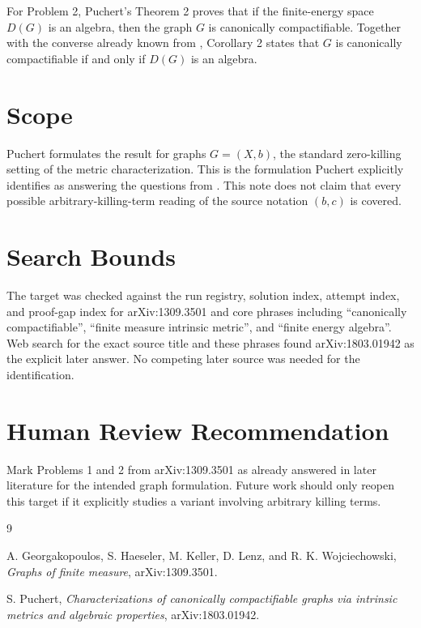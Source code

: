 \documentclass[11pt]{article}
\begin{document}
For Problem 2, Puchert's Theorem 2 proves that if the finite-energy space
$D(G)$ is an algebra, then the graph $G$ is canonically compactifiable.
Together with the converse already known from \cite{GHKLW}, Corollary 2 states
that $G$ is canonically compactifiable if and only if $D(G)$ is an algebra.

\section*{Scope}

Puchert formulates the result for graphs $G=(X,b)$, the standard zero-killing
setting of the metric characterization. This is the formulation Puchert
explicitly identifies as answering the questions from \cite{GHKLW}. This note
does not claim that every possible arbitrary-killing-term reading of the
source notation $(b,c)$ is covered.

\section*{Search Bounds}

The target was checked against the run registry, solution index, attempt
index, and proof-gap index for arXiv:1309.3501 and core phrases including
``canonically compactifiable'', ``finite measure intrinsic metric'', and
``finite energy algebra''. Web search for the exact source title and these
phrases found arXiv:1803.01942 as the explicit later answer. No competing
later source was needed for the identification.

\section*{Human Review Recommendation}

Mark Problems 1 and 2 from arXiv:1309.3501 as already answered in later
literature for the intended graph formulation. Future work should only reopen
this target if it explicitly studies a variant involving arbitrary killing
terms.

\begin{thebibliography}{9}

A. Georgakopoulos, S. Haeseler, M. Keller, D. Lenz, and R. K. Wojciechowski,
\emph{Graphs of finite measure}, arXiv:1309.3501.

S. Puchert, \emph{Characterizations of canonically compactifiable graphs via
intrinsic metrics and algebraic properties}, arXiv:1803.01942.

\end{thebibliography}
\end{document}
